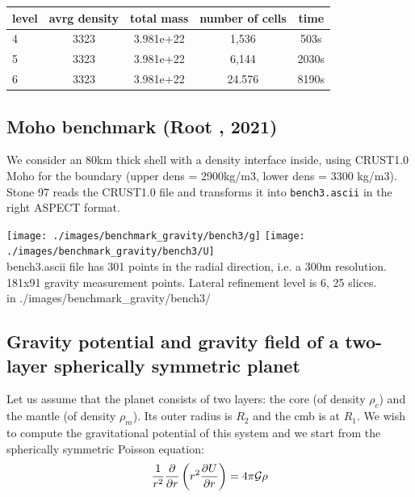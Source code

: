 \begin{tabular}{lcccc}
\hline
level & avrg density & total mass & number of cells & time \\
\hline
\hline
4     & 3323  & 3.981e+22 & 1,536  & 503s  \\
5     & 3323  & 3.981e+22 & 6,144  & 2030s \\
6     & 3323  & 3.981e+22 & 24.576 & 8190s \\
\hline
\end{tabular}

\newpage
\subsection{Moho benchmark (Root \etal, 2021)}

We consider an 80km thick shell with a density interface inside, using CRUST1.0 Moho 
for the boundary (upper dens = 2900kg/m3, lower dens = 3300 kg/m3).
Stone 97 reads the CRUST1.0 file and transforms it into {\tt bench3.ascii} in the 
right ASPECT format.  


\begin{center}
\texttt{[image: ./images/benchmark\_gravity/bench3/g]}
\texttt{[image: ./images/benchmark\_gravity/bench3/U]}\\
{\captionfont bench3.ascii file has 301 points in the radial direction, i.e. a 
300m resolution. 181x91 gravity measurement points. Lateral refinement level is 6, 25 slices.\\
{\tiny {\color{gray} in ./images/benchmark\_gravity/bench3/}}
}
\end{center}


\newpage
\subsection{Gravity potential and gravity field of a two-layer 
spherically symmetric planet}


Let us assume that the planet consists of two layers: 
the core (of density $\rho_c$) and the mantle (of density $\rho_m$).
Its outer radius is $R_2$ and the cmb is at $R_1$.
We wish to compute the gravitational potential of this system
and we start from the spherically symmetric Poisson equation:
\begin{equation}
\frac{1}{r^2} \frac{\partial}{\partial r}\left( r^2 \frac{\partial U}{\partial r} \right)
=
4 \pi {\cal G} \rho
\label{poissonpde}
\end{equation}

